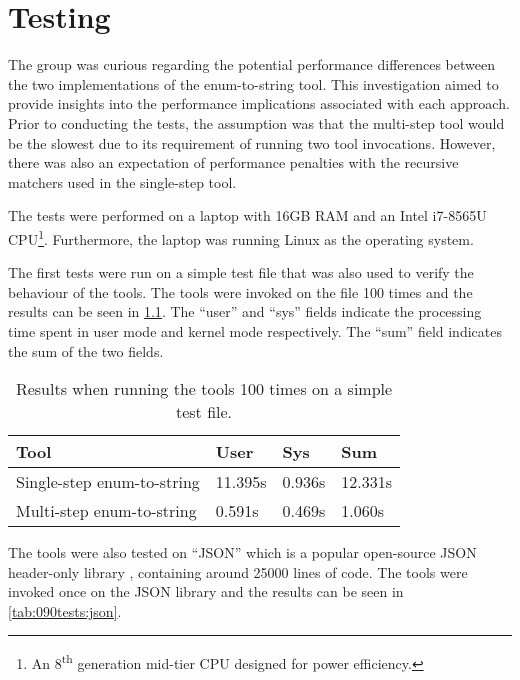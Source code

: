 \chapter{Testing}\label{chp:090:tests}
The group was curious regarding the potential performance differences between the two implementations of the enum-to-string tool.
This investigation aimed to provide insights into the performance implications associated with each approach.
Prior to conducting the tests, the assumption was that the multi-step tool would be the slowest due to its requirement of running two tool invocations.
However, there was also an expectation of performance penalties with the recursive matchers used in the single-step tool.

The tests were performed on a laptop with 16GB RAM and an Intel i7-8565U CPU\footnote{
    An 8\textsuperscript{th} generation mid-tier CPU designed for power efficiency.
}. Furthermore, the laptop was running Linux as the operating system.

The first tests were run on a simple test file that was also used to verify the behaviour of the tools. The tools were invoked on the file 100 times and the results can be seen in \cref{tab:090tests:simple}. The ``user'' and ``sys'' fields indicate the processing time spent in user mode and kernel mode respectively. The ``sum'' field indicates the sum of the two fields.

\begin{table}[H]
    \centering
    \begin{tabular}{|p{}|p{}|p{}|p{}|}
    \hline
    \rowcolor{gray!30}
    \textbf{Tool} & \textbf{User} & \textbf{Sys} & \textbf{Sum} \\ \hline
    Single-step enum-to-string & 11.395s & 0.936s & 12.331s \\ \hline
    Multi-step enum-to-string & 0.591s & 0.469s & 1.060s \\ \hline
    \end{tabular}
    \caption{Results when running the tools 100 times on a simple test file.}
    \label{tab:090tests:simple}
\end{table}
\vspace*{-1em}

The tools were also tested on ``JSON'' which is a popular open-source JSON header-only library \cite{lohmannJSONModern2022}, containing around 25000 lines of code.
The tools were invoked once on the JSON library and the results can be seen in \cref{tab:090tests:json}.

